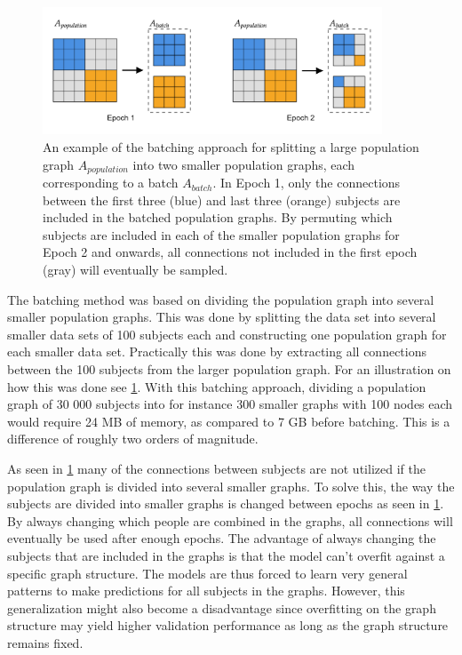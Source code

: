 \begin{figure}[H]
    \centering
    \includegraphics[width=0.9\textwidth]{chapters/images_methods/batches.png}
    \caption{An example of the batching approach for splitting a large population graph $A_{population}$ into two smaller population graphs, each corresponding to a batch $A_{batch}$. In Epoch 1, only the connections between the first three (blue) and last three (orange) subjects are included in the batched population graphs. By permuting which subjects are included in each of the smaller population graphs for Epoch 2 and onwards, all connections not included in the first epoch (gray) will eventually be sampled.}
    \label{fig:batches}
\end{figure}

The batching method was based on dividing the population graph into several smaller population graphs. This was done by splitting the data set into several smaller data sets of 100 subjects each and constructing one population graph for each smaller data set. Practically this was done by extracting all connections between the 100 subjects from the larger population graph. For an illustration on how this was done see \cref{fig:batches}. With this batching approach, dividing a population graph of 30 000 subjects into for instance 300 smaller graphs with 100 nodes each would require 24 MB of memory, as compared to 7 GB before batching. This is a difference of roughly two orders of magnitude.

As seen in \cref{fig:batches} many of the connections between subjects are not utilized if the population graph is divided into several smaller graphs. To solve this, the way the subjects are divided into smaller graphs is changed between epochs as seen in \cref{fig:batches}. By always changing which people are combined in the graphs, all connections will eventually be used after enough epochs. The advantage of always changing the subjects that are included in the graphs is that the model can't overfit against a specific graph structure. The models are thus forced to learn very general patterns to make predictions for all subjects in the graphs. However, this generalization might also become a disadvantage since overfitting on the graph structure may yield higher validation performance as long as the graph structure remains fixed. 


